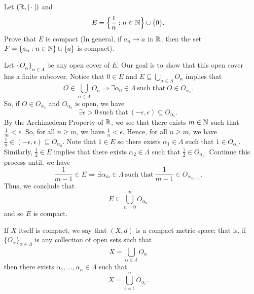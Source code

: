 \documentclass[a4paper]{report}
\begin{document}
\begin{eg}
   Let \( (\mathbb{R}, | \cdot | ) \) and  
   \[  E = \Big\{\frac{ 1 }{ n }  : n \in \mathbb{N} \Big\} \cup \{ 0  \}. \]
   Prove that \( E  \) is compact (In general, if \( {a}_{n} \to a  \) in \( \mathbb{R}  \), then the set \( F = \{ {a}_{n} : n \in \mathbb{N}  \} \cup \{ a \}   \) is compact).
    
   Let \( \{ {O}_{\alpha} \}_{\alpha \in \Lambda} \) be any open cover of \( E  \). Our goal is to show that this open cover has a finite subcover. Notice that \( 0 \in E  \) and \( E \subseteq \bigcup_{ \alpha \in \Lambda }^{  } {O}_{\alpha} \) implies that 
   \[  O \in \bigcup_{  \alpha \in \Lambda }^{  }  {O}_{\alpha} \Longrightarrow \exists {\alpha}_{0} \in \Lambda \ \text{such that} \ O \in {O}_{{\alpha}_{0}}. \]
   So, if \( O \in {O}_{{\alpha}_{0}}  \) and \( {O}_{{\alpha}_{0}}  \) is open, we have 
   \[  \exists \epsilon > 0 \ \text{such that} \ (- \epsilon , \epsilon) \subseteq  {O}_{{\alpha}_{0}}. \]
   By the Archimedean Property of \( \mathbb{R}  \), we see that there exists \( m \in \mathbb{N}  \) such that \( \frac{ 1 }{ m   }  < \epsilon \). So, for all \( n \geq m  \), we have \( \frac{ 1 }{ n }  < \epsilon  \). Hence, for all \( n \geq m  \), we have \( \frac{ 1 }{ n }  \in (- \epsilon , \epsilon ) \subseteq  {O}_{{\alpha}_{0}} \). Note that \( 1 \in E  \) so there exists \( {\alpha}_{1} \in \Lambda \) such that \( 1 \in {O}_{{\alpha}_{1}} \). Similarly, \( \frac{ 1 }{ 2 }  \in E  \) implies that there exists \( {\alpha}_{2} \in \Lambda \) such that \( \frac{ 1 }{ 2 }  \in {O}_{{\alpha}_{2}} \). Continue this process until, we have 
   \[  \frac{ 1 }{ m - 1  } \in E \Longrightarrow \exists {\alpha}_{m} \in \Lambda \ \text{such that} \ \frac{ 1 }{ m - 1  }  \in {O}_{{\alpha}_{m-1}}. \]
   Thus, we conclude that 
   \[  E \subseteq \bigcup_{ n=0  }^{ \infty   }  {O}_{{\alpha}_{n}} \]
   and so \( E  \) is compact.

\end{eg}

\begin{remark}
    If \( X  \) itself is compact, we say that \( (X,d) \) is a compact metric space; that is, if \( \{ {O}_{\alpha} \}_{\alpha \in \Lambda} \) is any collection of open sets such that  
    \[  X = \bigcup_{ \alpha \in \Lambda }^{  }  {O}_{\alpha} \]
    then there exists \( {\alpha}_{1}, \dots, {\alpha}_{n} \in \Lambda \) such that 
    \[  X = \bigcup_{ i=1  }^{ n }  {O}_{{\alpha}_{i}}. \]
\end{remark}
\end{document}
